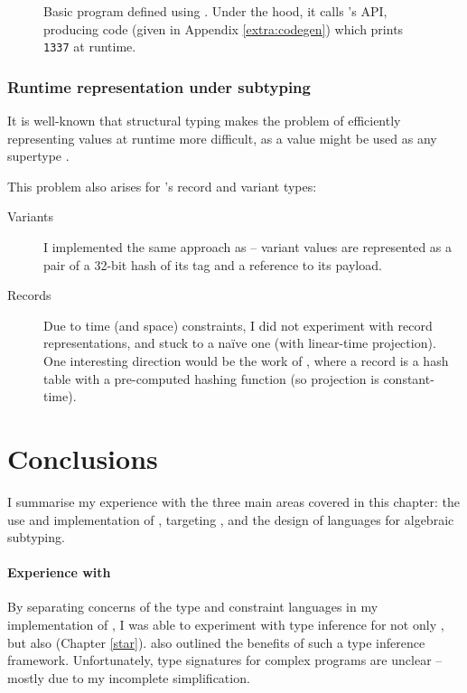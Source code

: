 \begin{figure}[p]
    \centering
    
    \caption{Basic program defined using \binaryendsl{}. Under the hood, it calls \binaryen{}'s API, producing \wasm{} code (given in Appendix \ref{extra:codegen}) which prints \texttt{1337} at runtime.}
    \label{fig:binaryer-example}
\end{figure}

\subsubsection{Runtime representation under subtyping}

It is well-known that structural typing makes the problem of efficiently representing values at runtime more difficult, as a value might be used as any supertype \cite{tapl}. 

This problem also arises for \fabric{}'s record and variant types: 
\begin{description}
    \item[Variants] I implemented the same approach as \textcite{polymorphic-variants} -- variant values are represented as a pair of a 32-bit hash of its tag and a reference to its payload.
    \item[Records] Due to time (and space) constraints, I did not experiment with record representations, and stuck to a na\"ive one (with linear-time projection). One interesting direction would be the work of \textcite{remy-extensible-records}, where a record is a hash table with a pre-computed hashing function (so projection is constant-time). 
\end{description}

\needspace{7em}
\section{Conclusions}

I summarise my experience with the three main areas covered in this chapter: the use and implementation of \inference{}, targeting \wasm{}, and the design of languages for algebraic subtyping. 

\paragraph{Experience with \inference{}}
By separating concerns of the type and constraint languages in my implementation of \compiler{}, I was able to experiment with type inference for not only \fabric{}, but also \starr{} (Chapter \ref{star}). \textcite{pottier-framework} also outlined the benefits of such a type inference framework. Unfortunately, type signatures for complex programs are unclear -- mostly due to my incomplete simplification. 


